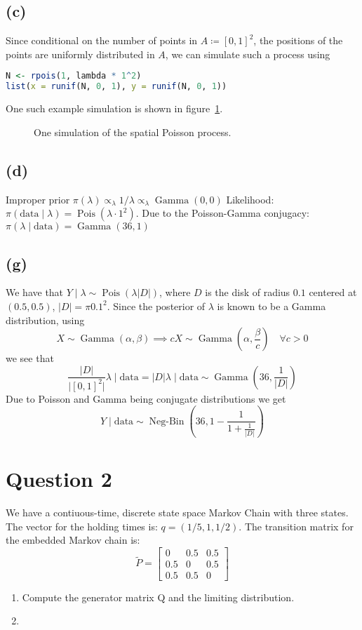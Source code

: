 \documentclass{article}
\DeclareMathOperator\Poisson{Pois}
\DeclareMathOperator\GammaDist{Gamma}
\DeclareMathOperator\NegBin{Neg-Bin}
\newcommand{\size}[1]{\lvert #1 \rvert}
\begin{document}
\subsection{(c)}
Since conditional on the number of points in $A \coloneqq [0, 1]^2$,
the positions of the points are uniformly distributed in $A$,
we can simulate such a process using
\begin{lstlisting}[language = R]
N <- rpois(1, lambda * 1^2)
list(x = runif(N, 0, 1), y = runif(N, 0, 1))
\end{lstlisting}
One such example simulation is shown in figure~\ref{fig:c_sim}.

\begin{figure}
	\centering
	
	\caption{One simulation of the spatial Poisson process. \label{fig:c_sim}}
\end{figure}

\subsection{(d)}
Improper prior $\pi(\lambda) \propto_\lambda 1/\lambda \propto_\lambda \GammaDist(0, 0)$
Likelihood: $\pi(\text{data} \mid \lambda) = \Poisson(\lambda \cdot 1^2)$.
Due to the Poisson-Gamma conjugacy: $\pi(\lambda \mid \text{data}) = \GammaDist(36, 1)$

\subsection{(g)}
We have that $Y \mid \lambda \sim \Poisson(\lambda \lvert D \rvert)$,
where $D$ is the disk of radius $0.1$ centered at $(0.5, 0.5)$,
$\lvert D \rvert = \pi 0.1^2$.
Since the posterior of $\lambda$ is known to be a Gamma distribution, using
$$ X \sim \GammaDist(\alpha, \beta) \implies cX \sim \GammaDist(\alpha, \frac\beta c) \quad \forall c>0 $$
we see that
$$ \frac{\size{D}}{\size{[0, 1]^2}} \lambda \mid \text{data} = \size{D} \lambda \mid \text{data}
\sim \GammaDist(36, \frac1{\size{D}}) $$
Due to Poisson and Gamma being conjugate distributions we get
$$ Y \mid \text{data} \sim \NegBin(36, 1 - \frac1{1 + \frac1{\size{D}}}) $$

\section{Question 2}
We have a contiuous-time, discrete state space Markov Chain with three states.
The vector for the holding times is: $q = (1/5, 1, 1/2)$.
The transition matrix for the embedded Markov chain is:
$$ \tilde{P} = \begin{bmatrix}
0 & 0.5 & 0.5\\
0.5 & 0 & 0.5\\
0.5 & 0.5 & 0
\end{bmatrix} $$
\begin{enumerate}[label=(\alph*)]
	\item Compute the generator matrix Q and the limiting distribution.
	\item
\end{enumerate}
\end{document}
